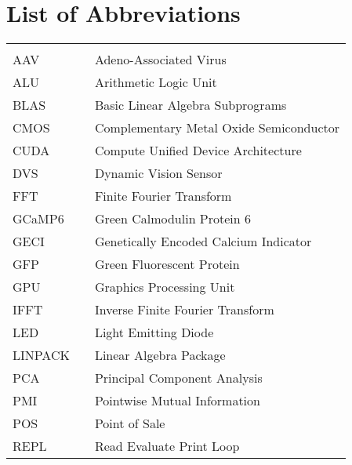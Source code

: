 \chapter*{List of Abbreviations}\label{list-of-abbreviations}

\begin{center}
    \begin{tabular}{lll}
        \hspace*{2em}    & \hspace*{1in} & \hspace*{4.5in}                        \\
      AAV               & \dotfill      & Adeno-Associated Virus  \\
      ALU               & \dotfill      & Arithmetic Logic Unit \\
      BLAS               & \dotfill      & Basic Linear Algebra Subprograms \\
      CMOS               & \dotfill      & Complementary Metal Oxide Semiconductor  \\
      CUDA               & \dotfill      & Compute Unified Device Architecture \\
      DVS               & \dotfill      & Dynamic Vision Sensor \\
      FFT               & \dotfill      & Finite Fourier Transform  \\
      GCaMP6               & \dotfill      & Green Calmodulin Protein 6 \\
      GECI               & \dotfill      & Genetically Encoded Calcium Indicator  \\
      GFP               & \dotfill      & Green Fluorescent Protein \\
      GPU               & \dotfill      & Graphics Processing Unit  \\
      IFFT               & \dotfill      & Inverse Finite Fourier Transform \\
      LED               & \dotfill      & Light Emitting Diode  \\
      LINPACK               & \dotfill      & Linear Algebra Package  \\
      PCA               & \dotfill      & Principal Component Analysis  \\
      PMI               & \dotfill      & Pointwise Mutual Information  \\
      POS               & \dotfill      & Point of Sale \\
      REPL               & \dotfill      & Read Evaluate Print Loop \\

\end{tabular}
\end{center}
